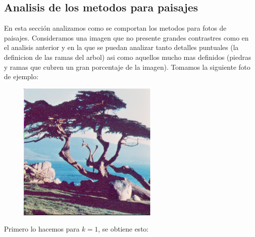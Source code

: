 \subsection{Analisis de los metodos para paisajes}

En esta sección analizamos como se comportan los metodos para fotos de paisajes. Consideramos una imagen que no presente grandes contrastres como en el analisis anterior y en la que se puedan analizar tanto detalles puntuales (la definicion de las ramas del arbol) asi como aquellos mucho mas definidos (piedras y ramas que cubren un gran porcentaje de la imagen). Tomamos la siguiente foto de ejemplo:

\begin{figure}[H]
\centering
\includegraphics[scale=0.50]{fotos/paisaje/orig.png}
\end{figure}

Primero lo hacemos para $k=1$, se obtiene esto:

